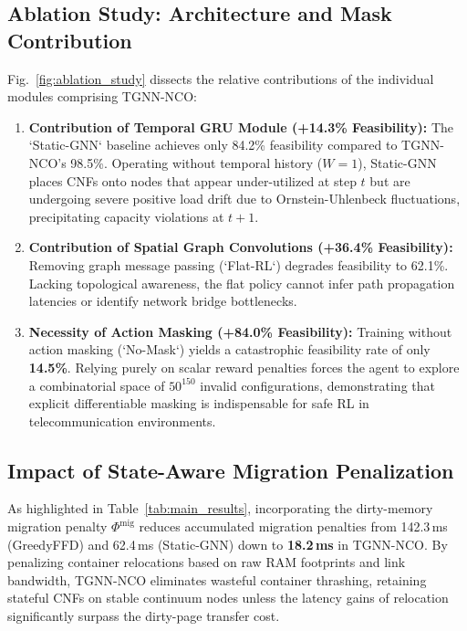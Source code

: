 \documentclass[conference]{IEEEtran}
\begin{document}
\subsection{Ablation Study: Architecture and Mask Contribution}
Fig.~\ref{fig:ablation_study} dissects the relative contributions of the individual modules comprising TGNN-NCO:
\begin{enumerate}
    \item \textbf{Contribution of Temporal GRU Module (+14.3\% Feasibility):} The `Static-GNN` baseline achieves only 84.2\% feasibility compared to TGNN-NCO's 98.5\%. Operating without temporal history ($W=1$), Static-GNN places CNFs onto nodes that appear under-utilized at step $t$ but are undergoing severe positive load drift due to Ornstein-Uhlenbeck fluctuations, precipitating capacity violations at $t+1$.
    \item \textbf{Contribution of Spatial Graph Convolutions (+36.4\% Feasibility):} Removing graph message passing (`Flat-RL`) degrades feasibility to 62.1\%. Lacking topological awareness, the flat policy cannot infer path propagation latencies or identify network bridge bottlenecks.
    \item \textbf{Necessity of Action Masking (+84.0\% Feasibility):} Training without action masking (`No-Mask`) yields a catastrophic feasibility rate of only \textbf{14.5\%}. Relying purely on scalar reward penalties forces the agent to explore a combinatorial space of $50^{150}$ invalid configurations, demonstrating that explicit differentiable masking is indispensable for safe RL in telecommunication environments.
\end{enumerate}

\subsection{Impact of State-Aware Migration Penalization}
As highlighted in Table~\ref{tab:main_results}, incorporating the dirty-memory migration penalty $\Phi^{\text{mig}}$ reduces accumulated migration penalties from 142.3\,ms (GreedyFFD) and 62.4\,ms (Static-GNN) down to \textbf{18.2\,ms} in TGNN-NCO. By penalizing container relocations based on raw RAM footprints and link bandwidth, TGNN-NCO eliminates wasteful container thrashing, retaining stateful CNFs on stable continuum nodes unless the latency gains of relocation significantly surpass the dirty-page transfer cost.

\end{document}

